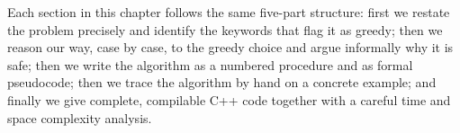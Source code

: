 Each section in this chapter follows the same five-part structure: first we
restate the problem precisely and identify the keywords that flag it as
greedy; then we reason our way, case by case, to the greedy choice and argue
informally why it is safe; then we write the algorithm as a numbered
procedure and as formal pseudocode; then we trace the algorithm by hand on a
concrete example; and finally we give complete, compilable C++ code together
with a careful time and space complexity analysis.

\newpage
















